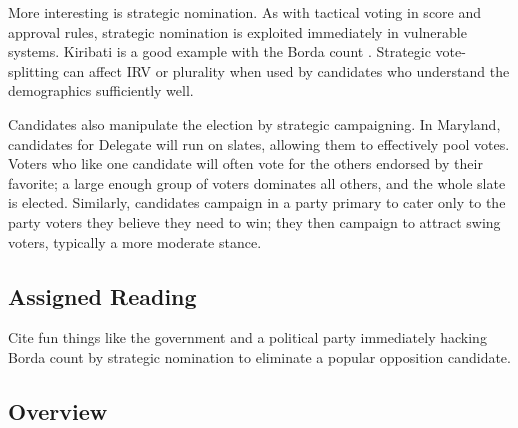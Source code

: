More interesting is strategic nomination.  As with tactical voting in score and approval rules, strategic nomination is exploited immediately in vulnerable systems.  Kiribati is a good example with the Borda count \autocite{Reilly2002}.  Strategic vote-splitting can affect IRV or plurality when used by candidates who understand the demographics sufficiently well.

Candidates also manipulate the election by strategic campaigning.  In Maryland, candidates for Delegate will run on slates, allowing them to effectively pool votes.  Voters who like one candidate will often vote for the others endorsed by their favorite; a large enough group of voters dominates all others, and the whole slate is elected.  Similarly, candidates campaign in a party primary to cater only to the party voters they believe they need to win; they then campaign to attract swing voters, typically a more moderate stance.

\subsection{Assigned Reading}

\begin{todo}
    Cite fun things like the government and a political party immediately hacking Borda count \autocite{Reilly2002} by strategic nomination to eliminate a popular opposition candidate.
\end{todo}

\subsection{Overview}

